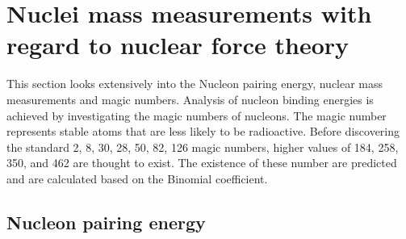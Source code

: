 \section{Nuclei mass measurements with regard to nuclear force theory}
This section looks extensively into the Nucleon pairing energy, nuclear mass measurements and magic numbers.
Analysis of nucleon binding energies is achieved by investigating the magic numbers of nucleons.
The magic number represents stable atoms that are less likely to be radioactive. 
Before discovering the standard 2, 8, 30, 28, 50, 82, 126 magic numbers, higher values of 184, 258, 350, and 462 are thought to exist. 
The existence of these number are predicted and are calculated based on the Binomial coefficient.
\subsection{Nucleon pairing energy}
